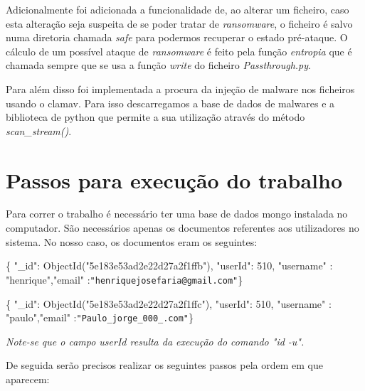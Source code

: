  \par Adicionalmente foi adicionada a funcionalidade de, ao alterar um ficheiro, caso esta alteração seja suspeita de se poder tratar de \textit{ransomware}, o ficheiro é salvo numa diretoria chamada \textit{safe} para podermos recuperar o estado pré-ataque. O cálculo de um possível ataque de \textit{ransomware} é feito pela função \textit{entropia} que é chamada sempre que se usa a função \textit{write} do ficheiro \textit{Passthrough.py}.\newline
 \par Para além disso foi implementada a procura da injeção de malware nos ficheiros usando o clamav. Para isso descarregamos a base de dados de malwares e a biblioteca de python que permite a sua utilização através do método \textit{scan\_stream()}.

\section{Passos para execução do trabalho}

 Para correr o trabalho é necessário ter uma base de dados mongo instalada no computador. São necessários apenas os documentos referentes aos utilizadores no sistema. No nosso caso, os documentos eram os seguintes:\newline


 \par \{ "\_id": ObjectId("5e183e53ad2e22d27a2f1ffb"), "userId": 510, "username" : "henrique",\newline "email" :\texttt{"henriquejosefaria@gmail.com"}\} \newline
 \par \{ "\_id": ObjectId("5e183e53ad2e22d27a2f1ffc"), "userId": 510, "username" : "paulo",\newline "email" :\texttt{"Paulo\_jorge\_000\_\@hotmail.com"}\}\newline



\par\textit{ Note-se que o campo userId resulta da execução do comando "id -u".}\newline


\par De seguida serão precisos realizar os seguintes passos pela ordem em que aparecem:\newline


